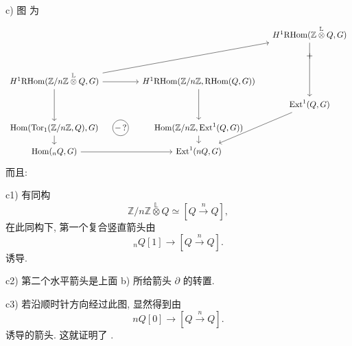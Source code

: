 \medskip
\noindent c) 图  为
\[
\begin{tikzcd}[column sep=small,row sep=small]
 &&&H^1\mathrm{RHom}
   (\mathbb Z\mathbin{\overset{\mathbb L}{\otimes}}Q,G)
   \arrow[ddd]\\
 &&&+\\
 H^1\mathrm{RHom}
   (\mathbb Z/n\mathbb Z\mathbin{\overset{\mathbb L}{\otimes}}Q,G)
   \arrow[rr]\arrow[dd]\arrow[uurrr]
 &&H^1\mathrm{RHom}
   (\mathbb Z/n\mathbb Z,\mathrm{RHom}(Q,G))
   \arrow[dd]&\\
 &&&\mathrm{Ext}^1(Q,G)\arrow[ddl]\\
 \mathrm{Hom}(\mathrm{Tor}_1(\mathbb Z/n\mathbb Z,Q),G)\arrow[d]
 &|[draw,circle,inner sep=1pt]|{-\,?}
 &\mathrm{Hom}(\mathbb Z/n\mathbb Z,\mathrm{Ext}^1(Q,G))
   \arrow[d]&\\
 \mathrm{Hom}({}_nQ,G)\arrow[rr]
 &&\mathrm{Ext}^1(nQ,G)&
\end{tikzcd}
\]
而且:

\smallskip
\noindent c1) 有同构
\[
 \mathbb Z/n\mathbb Z
 \mathbin{\overset{\mathbb L}{\otimes}}Q
 \simeq[Q\xrightarrow{n}Q],
\]
在此同构下, 第一个复合竖直箭头由
\[
 {}_nQ[1]\longrightarrow[Q\xrightarrow{n}Q].
\]
诱导.

\smallskip
\noindent c2) 第二个水平箭头是上面 b) 所给箭头 $\partial$ 的转置.

\smallskip
\noindent c3) 若沿顺时针方向经过此图, 显然得到由
\[
 nQ[0]\longrightarrow[Q\xrightarrow{n}Q].
\]
诱导的箭头. 这就证明了 .



